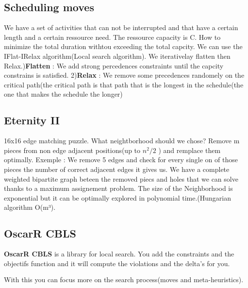 \subsection{Scheduling moves}
We have a set of activities that can not be interrupted and that have a certain length and a certain ressource need.
The ressource capacity is C.
How to minimize the total duration withtou exceeding the total capcity.\newline
We can use the IFlat-IRelax algorithm(Local search algorithm).\newline
We iterativelay flatten then Relax.)\textbf{Flatten} : We add strong percedences constraints until the capcity constrains is satisfied.
2)\textbf{Relax} : We remove some precedences randomely on the critical path(the critical path is that path that is the longest in the schedule(the one that makes the schedule the longer)

\subsection{Eternity II}
16x16 edge matching puzzle.\newline
What neightborhood should we chose?\newline
Remove m pieces from non edge adjacent positions(up to $n^2/2$ ) and remplace them optimally. \newline
Exemple : We remove 5 edges and check for every single on of those pieces the number of correct adjacent edges it gives us. We have a complete weighted bipartite graph beteen the removed piecs and holes that we can solve thanks to a maximum assignement problem.
The size of the Neighborhood is exponential but it can be optimally explored in polynomial time.(Hungarian algorithm O(m³).


















\subsection{OscarR CBLS}
\textbf{OscarR CBLS} is a library for local search.
You add the constraints and the objectifs function and it will compute the violations and the delta's for you.

With this you can focus more on the search process(moves and meta-heuristics).
